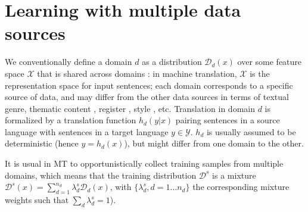 \documentclass[11pt,a4paper]{article}
\newcommand{\revision}[1]{#1}
\begin{document}

\section{Learning with multiple data sources} \label{sec:mdmt}

We conventionally define a domain $d$ as a distribution $\mathcal{D}_d(x)$ over some feature space $\mathcal{X}$ that is shared across domains \cite{Pan10asurvey}: in machine translation, $\mathcal{X}$ is the representation space for input sentences; each domain corresponds to a specific source of data, and may differ from the other data sources in terms of textual genre, thematic content \cite{Chen16guided,Zhang16topicinformed}, register \cite{Sennrich16politeness}, style \cite{Niu18multitask}, etc. Translation in domain $d$ is formalized by a translation function $h_d(y|x)$ pairing sentences in a source language with sentences in a target language $y \in \mathcal{Y}$. $h_d$ is usually assumed to be deterministic (hence $y = h_d(x)$), but might differ from one domain to the other.

It is usual in MT to opportunistically collect training samples from multiple domains, which means that the training distribution $\mathcal{D}^s$ is a mixture $\mathcal{D}^s(x) = \sum_{d=1}^{n_d} \lambda^{s}_{d} \mathcal{D}_d(x)$\revision{, with $\{\lambda^{s}_d, d=1 \dots n_d\}$ the corresponding mixture weights such that $\sum_d \lambda^{s}_d=1$)}.
\end{document}
